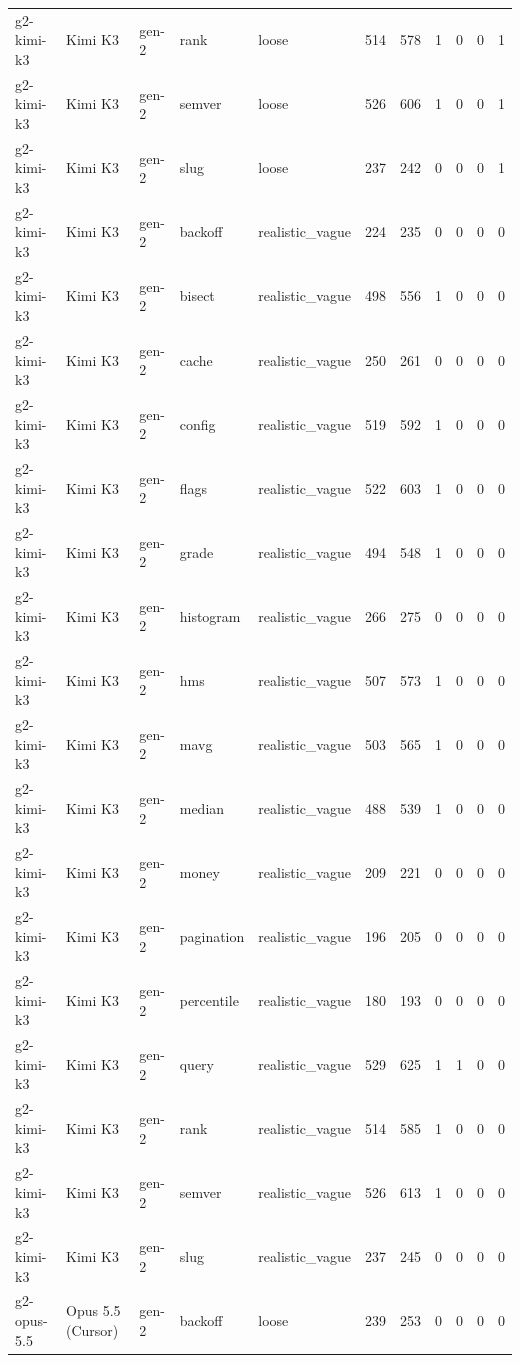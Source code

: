 \begin{tabular}{lllllllllll}
g2-kimi-k3 & Kimi K3 & gen-2 & rank & loose & 514 & 578 & 1 & 0 & 0 & 1 \\
g2-kimi-k3 & Kimi K3 & gen-2 & semver & loose & 526 & 606 & 1 & 0 & 0 & 1 \\
g2-kimi-k3 & Kimi K3 & gen-2 & slug & loose & 237 & 242 & 0 & 0 & 0 & 1 \\
g2-kimi-k3 & Kimi K3 & gen-2 & backoff & realistic\_vague & 224 & 235 & 0 & 0 & 0 & 0 \\
g2-kimi-k3 & Kimi K3 & gen-2 & bisect & realistic\_vague & 498 & 556 & 1 & 0 & 0 & 0 \\
g2-kimi-k3 & Kimi K3 & gen-2 & cache & realistic\_vague & 250 & 261 & 0 & 0 & 0 & 0 \\
g2-kimi-k3 & Kimi K3 & gen-2 & config & realistic\_vague & 519 & 592 & 1 & 0 & 0 & 0 \\
g2-kimi-k3 & Kimi K3 & gen-2 & flags & realistic\_vague & 522 & 603 & 1 & 0 & 0 & 0 \\
g2-kimi-k3 & Kimi K3 & gen-2 & grade & realistic\_vague & 494 & 548 & 1 & 0 & 0 & 0 \\
g2-kimi-k3 & Kimi K3 & gen-2 & histogram & realistic\_vague & 266 & 275 & 0 & 0 & 0 & 0 \\
g2-kimi-k3 & Kimi K3 & gen-2 & hms & realistic\_vague & 507 & 573 & 1 & 0 & 0 & 0 \\
g2-kimi-k3 & Kimi K3 & gen-2 & mavg & realistic\_vague & 503 & 565 & 1 & 0 & 0 & 0 \\
g2-kimi-k3 & Kimi K3 & gen-2 & median & realistic\_vague & 488 & 539 & 1 & 0 & 0 & 0 \\
g2-kimi-k3 & Kimi K3 & gen-2 & money & realistic\_vague & 209 & 221 & 0 & 0 & 0 & 0 \\
g2-kimi-k3 & Kimi K3 & gen-2 & pagination & realistic\_vague & 196 & 205 & 0 & 0 & 0 & 0 \\
g2-kimi-k3 & Kimi K3 & gen-2 & percentile & realistic\_vague & 180 & 193 & 0 & 0 & 0 & 0 \\
g2-kimi-k3 & Kimi K3 & gen-2 & query & realistic\_vague & 529 & 625 & 1 & 1 & 0 & 0 \\
g2-kimi-k3 & Kimi K3 & gen-2 & rank & realistic\_vague & 514 & 585 & 1 & 0 & 0 & 0 \\
g2-kimi-k3 & Kimi K3 & gen-2 & semver & realistic\_vague & 526 & 613 & 1 & 0 & 0 & 0 \\
g2-kimi-k3 & Kimi K3 & gen-2 & slug & realistic\_vague & 237 & 245 & 0 & 0 & 0 & 0 \\
g2-opus-5.5 & Opus 5.5 (Cursor) & gen-2 & backoff & loose & 239 & 253 & 0 & 0 & 0 & 0 \\

\end{tabular}
